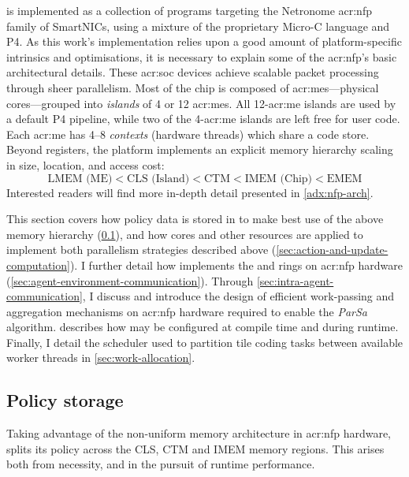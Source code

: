\approachshort{} is implemented as a collection of programs targeting the Netronome \gls{acr:nfp} family of SmartNICs, using a mixture of the proprietary Micro-C language and P4.
As this work's implementation relies upon a good amount of platform-specific intrinsics and optimisations, it is necessary to explain some of the \gls{acr:nfp}'s basic architectural details.
These \gls{acr:soc} devices achieve scalable packet processing through sheer parallelism.
Most of the chip is composed of \glspl{acr:me}---physical cores---grouped into \emph{islands} of 4 or 12 \glspl{acr:me}.
All 12-\gls{acr:me} islands are used by a default P4 pipeline, while two of the 4-\gls{acr:me} islands are left free for user code.
Each \gls{acr:me} has \numrange{4}{8} \emph{contexts} (hardware threads) which share a code store.
Beyond registers, the platform implements an explicit memory hierarchy scaling in size, location, and access cost:
$$\text{LMEM (ME)} < \text{CLS (Island)} < \text{CTM} < \text{IMEM (Chip)} < \text{EMEM}$$
Interested readers will find more in-depth detail presented in \cref{adx:nfp-arch}.

This section covers how policy data is stored in \approachshort{} to make best use of the above memory hierarchy (\cref{sec:policy-storage}), and how cores and other resources are applied to implement both parallelism strategies described above (\cref{sec:action-and-update-computation}).
I further detail how \approachshort{} implements the \inring{} and \outring{} rings on \gls{acr:nfp} hardware (\cref{sec:agent-environment-communication}).
Through \cref{sec:intra-agent-communication}, I discuss and introduce the design of efficient work-passing and aggregation mechanisms on \gls{acr:nfp} hardware required to enable the \emph{ParSa} algorithm.
 describes how \approachshort{} may be configured at compile time and during runtime.
Finally, I detail the scheduler used to partition tile coding tasks between available worker threads in \cref{sec:work-allocation}.


\subsection{Policy storage}\label{sec:policy-storage}
Taking advantage of the non-uniform memory architecture in \gls{acr:nfp} hardware, \approachshort{} splits its policy across the CLS, CTM and IMEM memory regions.
This arises both from necessity, and in the pursuit of runtime performance.

